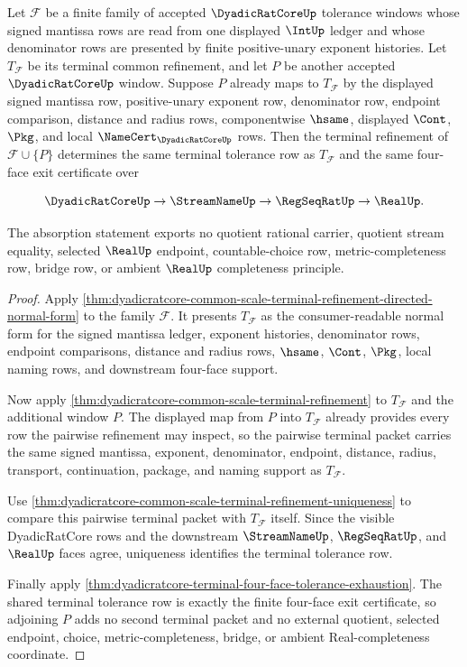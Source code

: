 \begin{theorem}
\label{thm:dyadicratcore-common-scale-terminal-refinement-absorption}
Let $\mathcal{F}$ be a finite family of accepted $\DyadicRatCoreUp$ tolerance windows whose signed mantissa rows are read from one displayed $\IntUp$ ledger and whose denominator rows are presented by finite positive-unary exponent histories. Let $T_{\mathcal{F}}$ be its terminal common refinement, and let $P$ be another accepted $\DyadicRatCoreUp$ window. Suppose $P$ already maps to $T_{\mathcal{F}}$ by the displayed signed mantissa row, positive-unary exponent row, denominator row, endpoint comparison, distance and radius rows, componentwise $\hsame$, displayed $\Cont$, $\Pkg$, and local $\NameCert_{\DyadicRatCoreUp}$ rows. Then the terminal refinement of $\mathcal{F}\cup\{P\}$ determines the same terminal tolerance row as $T_{\mathcal{F}}$ and the same four-face exit certificate over

$$
\DyadicRatCoreUp \to \StreamNameUp \to \RegSeqRatUp \to \RealUp .
$$

The absorption statement exports no quotient rational carrier, quotient stream equality, selected $\RealUp$ endpoint, countable-choice row, metric-completeness row, bridge row, or ambient $\RealUp$ completeness principle.
\end{theorem}
\begin{proof}
Apply \autoref{thm:dyadicratcore-common-scale-terminal-refinement-directed-normal-form} to the family $\mathcal{F}$. It presents $T_{\mathcal{F}}$ as the consumer-readable normal form for the signed mantissa ledger, exponent histories, denominator rows, endpoint comparisons, distance and radius rows, $\hsame$, $\Cont$, $\Pkg$, local naming rows, and downstream four-face support.

Now apply \autoref{thm:dyadicratcore-common-scale-terminal-refinement} to $T_{\mathcal{F}}$ and the additional window $P$. The displayed map from $P$ into $T_{\mathcal{F}}$ already provides every row the pairwise refinement may inspect, so the pairwise terminal packet carries the same signed mantissa, exponent, denominator, endpoint, distance, radius, transport, continuation, package, and naming support as $T_{\mathcal{F}}$.

Use \autoref{thm:dyadicratcore-common-scale-terminal-refinement-uniqueness} to compare this pairwise terminal packet with $T_{\mathcal{F}}$ itself. Since the visible DyadicRatCore rows and the downstream $\StreamNameUp$, $\RegSeqRatUp$, and $\RealUp$ faces agree, uniqueness identifies the terminal tolerance row.

Finally apply \autoref{thm:dyadicratcore-terminal-four-face-tolerance-exhaustion}. The shared terminal tolerance row is exactly the finite four-face exit certificate, so adjoining $P$ adds no second terminal packet and no external quotient, selected endpoint, choice, metric-completeness, bridge, or ambient Real-completeness coordinate.
\end{proof}

